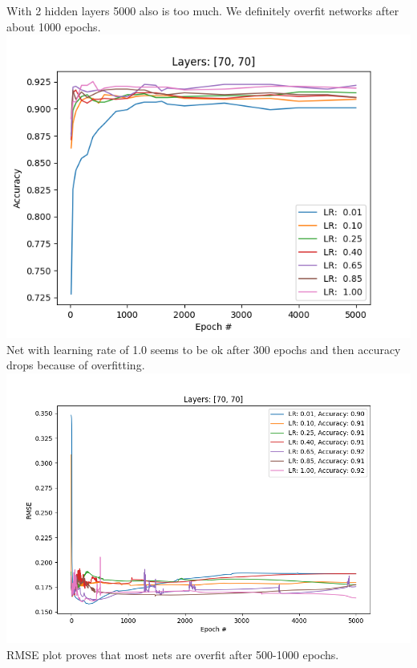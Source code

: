 \documentclass[12pt, letterpaper]{article}
\begin{document}
\begin{enumerate}[label=\Roman*.]
	    With 2 hidden layers 5000 also is too much. We definitely overfit networks after about 1000 epochs.
	     {\center \includegraphics[scale=0.7]{../images/accuracy2_20.png} \\}
	     Net with learning rate of 1.0 seems to be ok after 300 epochs and then accuracy drops because of overfitting.
	     {\center \includegraphics[scale=0.7]{../images/rmse3_20.png} \\}
	     RMSE plot proves that most nets are overfit after 500-1000 epochs.\\
	     

\end{enumerate}
\end{document}

